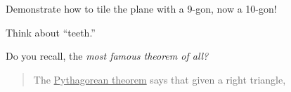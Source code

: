 \documentclass[noauthor,nooutcomes,handout,hints]{ximera}
\begin{document}
\begin{question}
  Demonstrate how to tile the plane with a 9-gon, now a 10-gon!

  \begin{hint}
    Think about ``teeth.''
  \end{hint}  
\end{question}
\mynewpage



\begin{question}
  Do you recall, the \textit{most famous theorem of all?}
    \begin{mdframed}[style=OutcomeStyle]\begin{quote}
    The \underline{Pythagorean theorem} says that given a right
    triangle,
    \begin{center}
\end{center}
\end{quote}
\end{mdframed}
\end{question}
\end{document}
